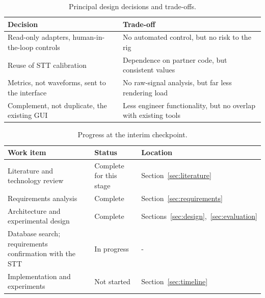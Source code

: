 \begin{table}[H]
    \centering\small
    \caption{Principal design decisions and trade-offs.}
    \label{tab:decisions}
    \begin{tabularx}{\columnwidth}{YY}
        \toprule
        Decision                                       & Trade-off                                                       \\
        \midrule
        Read-only adapters, human-in-the-loop controls & No automated control, but no risk to the rig                    \\
        Reuse of STT calibration                       & Dependence on partner code, but consistent values               \\
        Metrics, not waveforms, sent to the interface  & No raw-signal analysis, but far less rendering load             \\
        Complement, not duplicate, the existing GUI    & Less engineer functionality, but no overlap with existing tools \\
        \bottomrule
    \end{tabularx}
\end{table}

\begin{table}[H]
    \centering\small
    \caption{Progress at the interim checkpoint.}
    \label{tab:progress}
    \begin{tabularx}{\columnwidth}{Yll}
        \toprule
        Work item                                               & Status                  & Location                                        \\
        \midrule
        Literature and technology review                        & Complete for this stage & Section~\ref{sec:literature}                    \\
        Requirements analysis                                   & Complete                & Section~\ref{sec:requirements}                  \\
        Architecture and experimental design                    & Complete                & Sections~\ref{sec:design},~\ref{sec:evaluation} \\
        Database search; requirements confirmation with the STT & In progress             & -                                               \\
        Implementation and experiments                          & Not started             & Section~\ref{sec:timeline}                      \\
        \bottomrule
    \end{tabularx}
\end{table}

